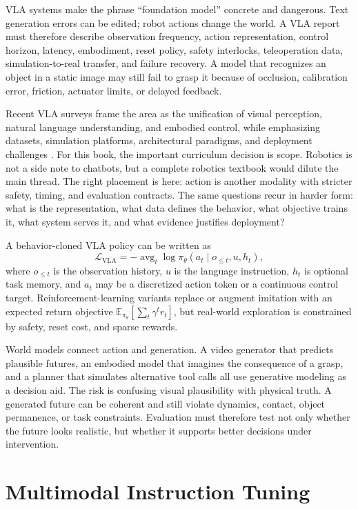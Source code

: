 VLA systems make the phrase ``foundation model'' concrete and dangerous. Text generation errors can be edited; robot actions change the world. A VLA report must therefore describe observation frequency, action representation, control horizon, latency, embodiment, reset policy, safety interlocks, teleoperation data, simulation-to-real transfer, and failure recovery. A model that recognizes an object in a static image may still fail to grasp it because of occlusion, calibration error, friction, actuator limits, or delayed feedback.

Recent VLA surveys frame the area as the unification of visual perception, natural language understanding, and embodied control, while emphasizing datasets, simulation platforms, architectural paradigms, and deployment challenges \cite{uddin2025vlasurvey}. For this book, the important curriculum decision is scope. Robotics is not a side note to chatbots, but a complete robotics textbook would dilute the main thread. The right placement is here: action is another modality with stricter safety, timing, and evaluation contracts. The same questions recur in harder form: what is the representation, what data defines the behavior, what objective trains it, what system serves it, and what evidence justifies deployment?

A behavior-cloned VLA policy can be written as
\[
  \mathcal{L}_{\mathrm{VLA}}
  =
  -\operatorname{avg}_t
  \log \pi_\theta(a_t \mid o_{\le t}, u, h_t),
\]
where $o_{\le t}$ is the observation history, $u$ is the language instruction, $h_t$ is optional task memory, and $a_t$ may be a discretized action token or a continuous control target. Reinforcement-learning variants replace or augment imitation with an expected return objective $\mathbb{E}_{\pi_\theta}[\sum_t \gamma^t r_t]$, but real-world exploration is constrained by safety, reset cost, and sparse rewards.

World models connect action and generation. A video generator that predicts plausible futures, an embodied model that imagines the consequence of a grasp, and a planner that simulates alternative tool calls all use generative modeling as a decision aid. The risk is confusing visual plausibility with physical truth. A generated future can be coherent and still violate dynamics, contact, object permanence, or task constraints. Evaluation must therefore test not only whether the future looks realistic, but whether it supports better decisions under intervention.

\section{Multimodal Instruction Tuning}
